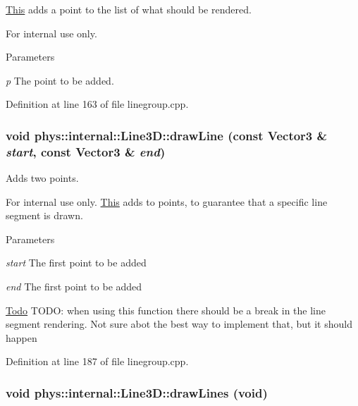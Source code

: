 \hyperlink{structThis}{This} adds a point to the list of what should be rendered. 

\begin{DoxyInternal}{For internal use only.}

\begin{DoxyParams}{Parameters}
\item[{\em p}]The point to be added. \end{DoxyParams}
\end{DoxyInternal}


Definition at line 163 of file linegroup.cpp.

\hypertarget{classphys_1_1internal_1_1Line3D_a31bf19dc06547cbe042e1ddfbcf672f3}{
\subsubsection[{drawLine}]{\setlength{\rightskip}{0pt plus 5cm}void phys::internal::Line3D::drawLine (const {\bf Vector3} \& {\em start}, \/  const {\bf Vector3} \& {\em end})}}
\label{d4/db5/classphys_1_1internal_1_1Line3D_a31bf19dc06547cbe042e1ddfbcf672f3}


Adds two points. 

\begin{DoxyInternal}{For internal use only.}
\hyperlink{structThis}{This} adds to points, to guarantee that a specific line segment is drawn. 
\begin{DoxyParams}{Parameters}
\item[{\em start}]The first point to be added \item[{\em end}]The first point to be added \end{DoxyParams}
\end{DoxyInternal}


\begin{Desc}
\item[\hyperlink{todo__todo000014}{Todo}]TODO: when using this function there should be a break in the line segment rendering. Not sure abot the best way to implement that, but it should happen \end{Desc}




Definition at line 187 of file linegroup.cpp.

\hypertarget{classphys_1_1internal_1_1Line3D_a008f0874c2213002e0c39330561f80f2}{
\subsubsection[{drawLines}]{\setlength{\rightskip}{0pt plus 5cm}void phys::internal::Line3D::drawLines (void)}}
\label{d4/db5/classphys_1_1internal_1_1Line3D_a008f0874c2213002e0c39330561f80f2}


